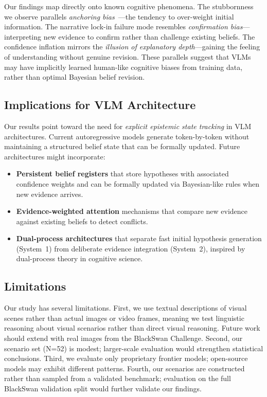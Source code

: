 Our findings map directly onto known cognitive phenomena.  The stubbornness we observe parallels \emph{anchoring bias}~\cite{lou2024anchoring}---the tendency to over-weight initial information.  The narrative lock-in failure mode resembles \emph{confirmation bias}---interpreting new evidence to confirm rather than challenge existing beliefs.  The confidence inflation mirrors the \emph{illusion of explanatory depth}---gaining the feeling of understanding without genuine revision.  These parallels suggest that VLMs may have implicitly learned human-like cognitive biases from training data, rather than optimal Bayesian belief revision.

\subsection{Implications for VLM Architecture}

Our results point toward the need for \emph{explicit epistemic state tracking} in VLM architectures.  Current autoregressive models generate token-by-token without maintaining a structured belief state that can be formally updated.  Future architectures might incorporate:
\begin{itemize}[leftmargin=*, nosep]
    \item \textbf{Persistent belief registers} that store hypotheses with associated confidence weights and can be formally updated via Bayesian-like rules when new evidence arrives.
    \item \textbf{Evidence-weighted attention} mechanisms that compare new evidence against existing beliefs to detect conflicts.
    \item \textbf{Dual-process architectures} that separate fast initial hypothesis generation (System~1) from deliberate evidence integration (System~2), inspired by dual-process theory in cognitive science.
\end{itemize}

\subsection{Limitations}

Our study has several limitations.  First, we use textual descriptions of visual scenes rather than actual images or video frames, meaning we test linguistic reasoning about visual scenarios rather than direct visual reasoning.  Future work should extend \method with real images from the BlackSwan Challenge.  Second, our scenario set (N=52) is modest; larger-scale evaluation would strengthen statistical conclusions.  Third, we evaluate only proprietary frontier models; open-source models may exhibit different patterns.  Fourth, our scenarios are constructed rather than sampled from a validated benchmark; evaluation on the full BlackSwan validation split would further validate our findings.

